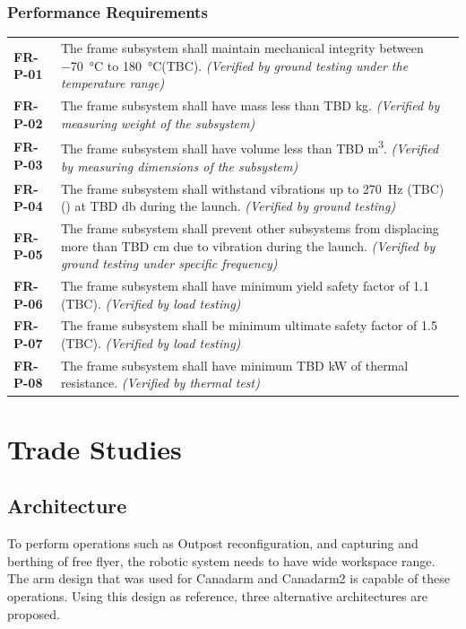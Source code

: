 \documentclass[12pt, letterpaper]{article}
\begin{document}
\subsubsection*{Performance Requirements}
\vspace{-20pt}
\begin{longtable}{P{2cm}P{13.75cm}}
\textbf{FR-P-01}	&
The frame subsystem shall maintain mechanical integrity between \SI{-70}{\degreeCelsius} to \SI{180}{\degreeCelsius}(TBC).
\textit{(Verified by ground testing under the temperature range)}	\\
\textbf{FR-P-02}	&
The frame subsystem shall have mass less than TBD \si{\kilo\gram}.
\textit{(Verified by measuring weight of the subsystem)}	\\
\textbf{FR-P-03}	&
The frame subsystem shall have volume less than TBD \si{\metre\cubed}.
\textit{(Verified by measuring dimensions of the subsystem)}	\\
\textbf{FR-P-04}	& The frame subsystem shall withstand vibrations up to \SI{270}{\hertz} (TBC) () at TBD \si{\decibel} during the launch.
\textit{(Verified by ground testing)}	\\
\textbf{FR-P-05}	&
The frame subsystem shall prevent other subsystems from displacing more than TBD \si{\centi\metre} due to vibration during the launch.
\textit{(Verified by ground testing under specific frequency)}	\\
\textbf{FR-P-06}	&
The frame subsystem shall have minimum yield safety factor of 1.1 (TBC).
\textit{(Verified by load testing)}	\\
\textbf{FR-P-07}	&
The frame subsystem shall be minimum ultimate safety factor of 1.5 (TBC).
\textit{(Verified by load testing)}									\\
\textbf{FR-P-08}	&
The frame subsystem shall have minimum TBD \si{\kilo\watt} of thermal resistance.
\textit{(Verified by thermal test)}
\end{longtable}

\captionsetup[table]{list=yes}
\setcounter{table}{1}
\section{Trade Studies}
\label{sect:tradeoff}
\subsection{Architecture}
\label{sect:architectureto}
To perform operations such as Outpost reconfiguration, and capturing and berthing of free flyer, the robotic system needs to have wide workspace range. The arm design that was used for Canadarm and Canadarm2 is capable of these operations. Using this design as reference, three alternative architectures are proposed. 
\end{document}
